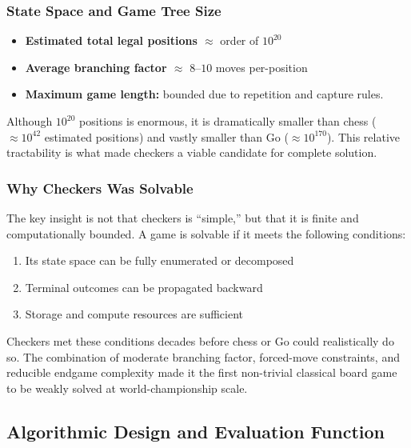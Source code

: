 \documentclass[11pt,a4paper]{report}
\begin{document}
\subsubsection{State Space and Game Tree Size}
\begin{itemize}
    \item \textbf{Estimated total legal positions $\approx$} order of $10^{20}$
    \item \textbf{Average branching factor $\approx$} $8$--$10$ moves per-position
    \item \textbf{Maximum game length:} bounded due to repetition and capture rules.
\end{itemize}
Although $10^{20}$ positions is enormous, it is dramatically smaller than chess ($\approx 10^{42}$ estimated positions)
and vastly smaller than Go ($\approx 10^{170}$). This relative tractability is what made checkers a viable candidate
for complete solution.

\subsubsection{Why Checkers Was Solvable}
The key insight is not that checkers is “simple,” but that it is finite and computationally bounded.
A game is solvable if it meets the following conditions:
\begin{enumerate}
\item Its state space can be fully enumerated or decomposed
\item Terminal outcomes can be propagated backward
\item Storage and compute resources are sufficient
\end{enumerate}
Checkers met these conditions decades before chess or Go could realistically do so. The combination of moderate branching
factor, forced-move constraints, and reducible endgame complexity made it the first non-trivial classical board game to be
weakly solved at world-championship scale.

\subsection{Algorithmic Design and Evaluation Function}
\end{document}
